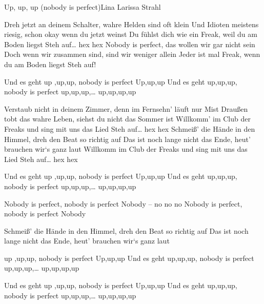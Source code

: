 \begin{song}{Up, up, up (nobody is perfect)}{Lina Larissa Strahl}{}

Dreh jetzt an deinem Schalter, wahre Helden sind oft klein
Und Idioten meistens riesig, schon okay wenn du jetzt weinst
Du fühlst dich wie ein Freak, weil du am Boden liegst
Steh auf… hex hex
Nobody is perfect, das wollen wir gar nicht sein
Doch wenn wir zusammen sind, sind wir weniger allein
Jeder ist mal Freak, wenn du am Boden liegst
Steh auf!

Und es geht up ,up,up, nobody is perfect
Up,up,up
Und es geht up,up,up, nobody is perfect
up,up,up,… up,up,up,up

Verstaub nicht in deinem Zimmer, denn im Fernsehn' läuft nur Mist
Draußen tobt das wahre Leben, siehst du nicht das Sommer ist
Willkomm' im Club der Freaks und sing mit uns das Lied
Steh auf… hex hex
Schmeiß' die Hände in den Himmel, dreh den Beat so richtig auf
Das ist noch lange nicht das Ende, heut' brauchen wir`s ganz laut
Willkomm im Club der Freaks und sing mit uns das Lied
Steh auf… hex hex

Und es geht up ,up,up, nobody is perfect
Up,up,up
Und es geht up,up,up, nobody is perfect
up,up,up,… up,up,up,up

Nobody is perfect, nobody is perfect
Nobody – no no no
Nobody is perfect, nobody is perfect
Nobody

Schmeiß' die Hände in den Himmel, dreh den Beat so richtig auf
Das ist noch lange nicht das Ende, heut' brauchen wir`s ganz laut

up ,up,up, nobody is perfect
Up,up,up
Und es geht up,up,up, nobody is perfect
up,up,up,… up,up,up,up

Und es geht up ,up,up, nobody is perfect
Up,up,up
Und es geht up,up,up, nobody is perfect
up,up,up,… up,up,up,up
\end{song}
